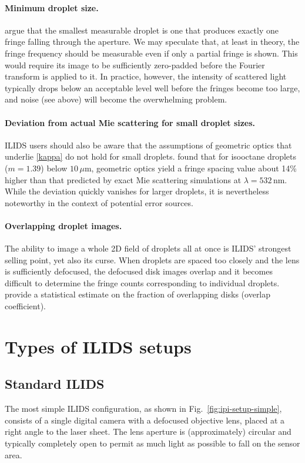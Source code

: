\documentclass[11.5pt]{book}
\newcommand*{\figref}[1]{Fig.~\ref{#1}}
\begin{document}
\paragraph{Minimum droplet size.}
\citet{Damaschke02} argue that the smallest measurable droplet is one that
produces exactly one fringe falling through the aperture. We may speculate that, at least
in theory, the fringe frequency should be measurable even if only a partial
fringe is shown. This would require its image to be sufficiently zero-padded
before the Fourier transform is applied to it. In practice, however, the
intensity of scattered light typically drops below an acceptable level well before
the fringes become too large, and noise (see above) will become the overwhelming
problem.

\paragraph{Deviation from actual Mie scattering for small droplet sizes.}
ILIDS users should also be aware that the assumptions of geometric optics
that underlie \eqref{kappa} do not hold for small droplets. \citet{Mounaim99}
found that for isooctane droplets ($m=1.39$) below $10\,\mu$m, geometric optics
yield a fringe spacing value about 14\% higher than that predicted by exact Mie
scattering simulations at $\lambda=532\,$nm. While the deviation quickly
vanishes for larger droplets, it is nevertheless noteworthy in the context of
potential error sources.

\paragraph{Overlapping droplet images.}
The ability to image a whole 2D field of droplets all at once is ILIDS' strongest
selling point, yet also its curse. When droplets are spaced too closely and the
lens is sufficiently defocused, the defocused disk images overlap and it becomes
difficult to determine the fringe counts corresponding to individual droplets.
\citet{Damaschke02} provide a statistical estimate on the fraction of
overlapping disks (overlap coefficient). 


\section{Types of ILIDS setups}
\label{sec:ipi-setup}
\subsection{Standard ILIDS}
The most simple ILIDS configuration, as shown in \figref{fig:ipi-setup-simple},
consists of a single digital camera with a defocused objective lens, placed at a right
angle to the laser sheet. The lens aperture is (approximately) circular and
typically completely open to permit as much light as possible to fall on the
sensor area.
\end{document}
